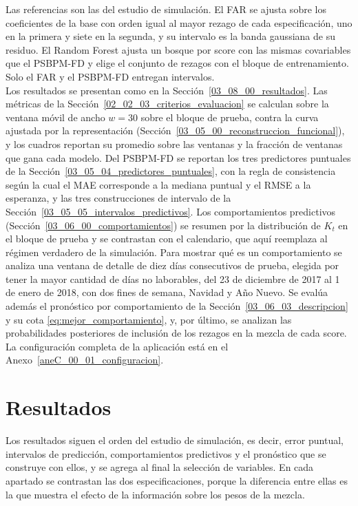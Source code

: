 Las referencias son las del estudio de simulación. El FAR se ajusta sobre los coeficientes de la base con orden igual al mayor rezago de cada especificación, uno en la primera y siete en la segunda, y su intervalo es la banda gaussiana de su residuo. El Random Forest ajusta un bosque por score con las mismas covariables que el PSBPM-FD y elige el conjunto de rezagos con el bloque de entrenamiento. Solo el FAR y el PSBPM-FD entregan intervalos.\\

Los resultados se presentan como en la Sección~\ref{03_08_00_resultados}. Las métricas de la Sección~\ref{02_02_03_criterios_evaluacion} se calculan sobre la ventana móvil de ancho $w = 30$ sobre el bloque de prueba, contra la curva ajustada por la representación (Sección~\ref{03_05_00_reconstruccion_funcional}), y los cuadros reportan su promedio sobre las ventanas y la fracción de ventanas que gana cada modelo. Del PSBPM-FD se reportan los tres predictores puntuales de la Sección~\ref{03_05_04_predictores_puntuales}, con la regla de consistencia según la cual el MAE corresponde a la mediana puntual y el RMSE a la esperanza, y las tres construcciones de intervalo de la Sección~\ref{03_05_05_intervalos_predictivos}. Los comportamientos predictivos (Sección~\ref{03_06_00_comportamientos}) se resumen por la distribución de $K_t$ en el bloque de prueba y se contrastan con el calendario, que aquí reemplaza al régimen verdadero de la simulación. Para mostrar qué es un comportamiento se analiza una ventana de detalle de diez días consecutivos de prueba, elegida por tener la mayor cantidad de días no laborables, del 23 de diciembre de 2017 al 1 de enero de 2018, con dos fines de semana, Navidad y Año Nuevo. Se evalúa además el pronóstico por comportamiento de la Sección~\ref{03_06_03_descripcion} y su cota \eqref{eq:mejor_comportamiento}, y, por último, se analizan las probabilidades posteriores de inclusión de los rezagos en la mezcla de cada score. La configuración completa de la aplicación está en el Anexo~\ref{aneC_00_01_configuracion}.

\section{Resultados}
\label{04_03_00_resultados}

Los resultados siguen el orden del estudio de simulación, es decir, error puntual, intervalos de predicción, comportamientos predictivos y el pronóstico que se construye con ellos, y se agrega al final la selección de variables. En cada apartado se contrastan las dos especificaciones, porque la diferencia entre ellas es la que muestra el efecto de la información sobre los pesos de la mezcla.

